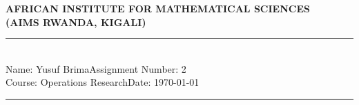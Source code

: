 \documentclass[12pt,a4paper]{article}
\newcommand{\student}{Yusuf Brima}
\newcommand{\course}{Operations Research}
\newcommand{\assignment}{2}
\begin{document}
\thispagestyle{empty}
\begin{center}
\textbf{AFRICAN INSTITUTE FOR MATHEMATICAL SCIENCES \\[0.5cm]
(AIMS RWANDA, KIGALI)}
\vspace{1.0cm}
\end{center}

\noindent
\rule{17cm}{0.2cm}\\[0.3cm]
Name: \student \hfill Assignment Number: \assignment\\[0.1cm]
Course: \course \hfill Date: \today\\
\rule{17cm}{0.05cm}
\vspace{1.0cm}
\end{document}
